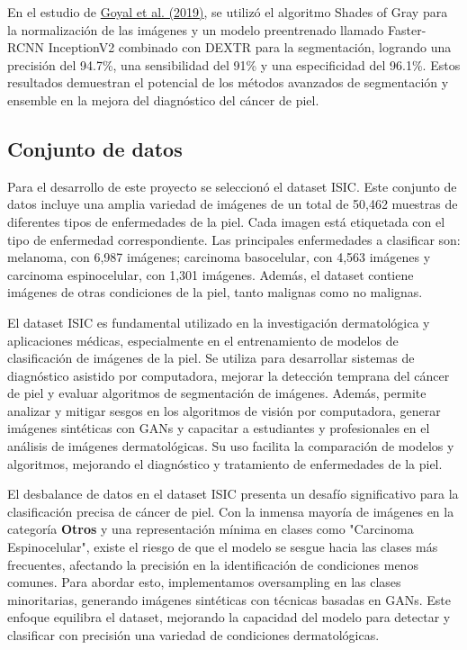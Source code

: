 \documentclass[12pt]{article}
\begin{document}
En el estudio de \href{https://www.semanticscholar.org/paper/Skin-lesion-boundary-segmentation-with-fully-deep-Goyal-Ng/b6dacb10fb81a39d563695c28dcc35959b587e86}{Goyal et al. (2019)}, se utilizó el algoritmo Shades of Gray para la normalización de las imágenes y un modelo 
preentrenado llamado Faster-RCNN InceptionV2 combinado con DEXTR para la segmentación, logrando una precisión del 94.7\%, una sensibilidad del 
91\% y una especificidad del 96.1\%. Estos resultados demuestran el potencial de los métodos avanzados de segmentación y ensemble en la mejora 
del diagnóstico del cáncer de piel.

\subsection{Conjunto de datos}
Para el desarrollo de este proyecto se seleccionó el dataset ISIC. Este conjunto de datos incluye una amplia variedad de imágenes de un total de 50,462 
muestras de diferentes tipos de enfermedades de la piel. Cada imagen está etiquetada con el tipo de enfermedad correspondiente. Las principales 
enfermedades a clasificar son: melanoma, con 6,987 imágenes; carcinoma basocelular, con 4,563 imágenes y carcinoma espinocelular, con 1,301 imágenes. 
Además, el dataset contiene imágenes de otras condiciones de la piel, tanto malignas como no malignas.

El dataset ISIC es fundamental utilizado en la investigación dermatológica y aplicaciones médicas, especialmente en el entrenamiento de modelos de 
clasificación de imágenes de la piel. Se utiliza para desarrollar sistemas de diagnóstico asistido por computadora, mejorar la detección temprana 
del cáncer de piel y evaluar algoritmos de segmentación de imágenes. Además, permite analizar y mitigar sesgos en los algoritmos de visión por 
computadora, generar imágenes sintéticas con GANs y capacitar a estudiantes y profesionales en el análisis de imágenes dermatológicas. 
Su uso facilita la comparación de modelos y algoritmos, mejorando el diagnóstico y tratamiento de enfermedades de la piel.


El desbalance de datos en el dataset ISIC presenta un desafío significativo para la clasificación precisa de cáncer de piel. Con la inmensa 
mayoría de imágenes en la categoría \textbf{Otros} y una representación mínima en clases como "Carcinoma Espinocelular", existe el riesgo de que el 
modelo se sesgue hacia las clases más frecuentes, afectando la precisión en la identificación de condiciones menos comunes. Para abordar esto, 
implementamos oversampling en las clases minoritarias, generando imágenes sintéticas con técnicas basadas en GANs. Este enfoque equilibra el dataset, 
mejorando la capacidad del modelo para detectar y clasificar con precisión una variedad de condiciones dermatológicas.
\end{document}
